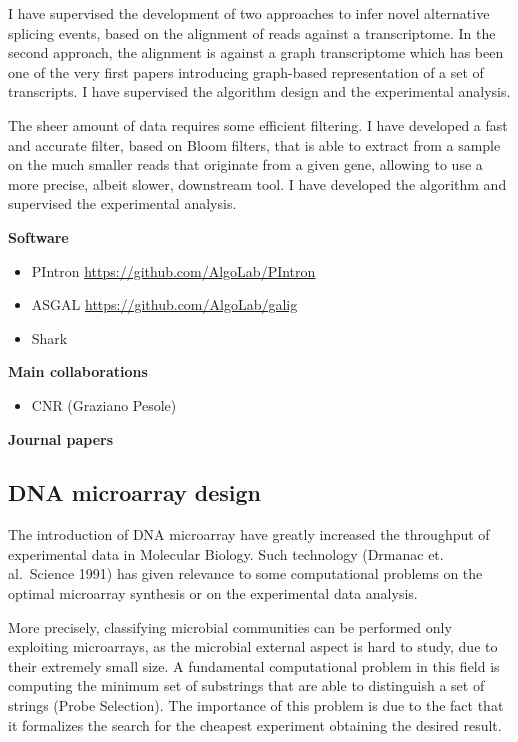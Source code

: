 \documentclass[11pt,a4paper,roman]{moderncv}
\begin{document}
I have supervised the development of two approaches to infer novel alternative
splicing events, based on the alignment of reads against a transcriptome.
In the second approach, the alignment is against a graph transcriptome which has
been one of the very first papers introducing graph-based representation of a
set of transcripts.
I have supervised the algorithm design and the experimental analysis.

The sheer amount of data requires some efficient filtering.
I have developed a fast and accurate filter, based on Bloom filters, that is
able to extract from a sample on the much smaller reads that originate from a
given gene, allowing to use a more precise, albeit slower, downstream tool.
I have developed the algorithm and supervised the experimental analysis.


\textbf{Software}

\begin{itemize}
\item
      PIntron \url{https://github.com/AlgoLab/PIntron}
\item
      ASGAL \url{https://github.com/AlgoLab/galig}
\item
      Shark
\end{itemize}



\textbf{Main collaborations}

\begin{itemize}
\item
      CNR (Graziano Pesole)
\end{itemize}

\textbf{Journal papers}

\cite{DBLP:journals/bioinformatics/DentiPPCVRB21}
\cite{DBLP:journals/bmcbi/DentiRBVPB18} \cite{DBLP:journals/jcb/BerettaBVPR14} \cite{DBLP:journals/bmcbi/PirolaRPPVB12}


\subsection{DNA microarray design}\label{dna-microarray-design}

The introduction of DNA microarray have greatly increased the throughput
of experimental data in Molecular Biology. Such technology (Drmanac et.
al.~Science 1991) has given relevance to some computational problems on
the optimal microarray synthesis or on the experimental data analysis.

More precisely, classifying microbial communities can be performed only
exploiting microarrays, as the microbial external aspect is hard to
study, due to their extremely small size. A fundamental computational
problem in this field is computing the minimum set of substrings that
are able to distinguish a set of strings (Probe Selection). The
importance of this problem is due to the fact that it formalizes the
search for the cheapest experiment obtaining the desired result.
\end{document}
